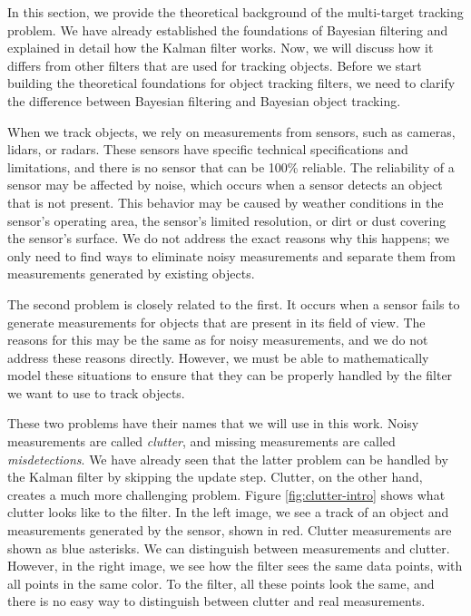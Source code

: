 
In this section, we provide the theoretical background of the multi-target tracking problem. We have already established the foundations of Bayesian filtering and explained in detail how the Kalman filter works. Now, we will discuss how it differs from other filters that are used for tracking objects. Before we start building the theoretical foundations for object tracking filters, we need to clarify the difference between Bayesian filtering and Bayesian object tracking.

When we track objects, we rely on measurements from sensors, such as cameras, lidars, or radars. These sensors have specific technical specifications and limitations, and there is no sensor that can be 100\% reliable. The reliability of a sensor may be affected by noise, which occurs when a sensor detects an object that is not present. This behavior may be caused by weather conditions in the sensor's operating area, the sensor's limited resolution, or dirt or dust covering the sensor's surface. We do not address the exact reasons why this happens; we only need to find ways to eliminate noisy measurements and separate them from measurements generated by existing objects.

The second problem is closely related to the first. It occurs when a sensor fails to generate measurements for objects that are present in its field of view. The reasons for this may be the same as for noisy measurements, and we do not address these reasons directly. However, we must be able to mathematically model these situations to ensure that they can be properly handled by the filter we want to use to track objects.

These two problems have their names that we will use in this work. Noisy measurements are called \textit{clutter}, and missing measurements are called \textit{misdetections}. We have already seen that the latter problem can be handled by the Kalman filter by skipping the update step. Clutter, on the other hand, creates a much more challenging problem. Figure \ref{fig:clutter-intro} shows what clutter looks like to the filter. In the left image, we see a track of an object and measurements generated by the sensor, shown in red. Clutter measurements are shown as blue asterisks. We can distinguish between measurements and clutter. However, in the right image, we see how the filter sees the same data points, with all points in the same color. To the filter, all these points look the same, and there is no easy way to distinguish between clutter and real measurements.

